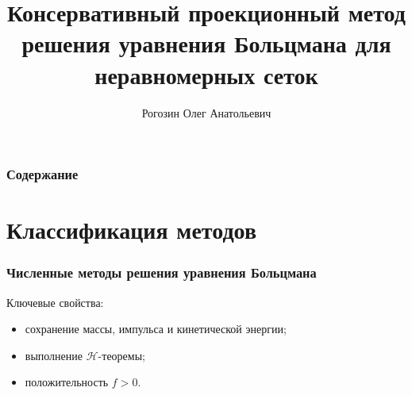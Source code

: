 \documentclass[mathserif]{beamer} %
\title{Консервативный проекционный метод решения уравнения Больцмана для неравномерных сеток}
\author{Рогозин Олег Анатольевич}
\institute{
    Вычислительный центр ФИЦ ИУ РАН
}
\date{}
\begin{document}
\frame{\titlepage}

\begin{frame}
    \frametitle{Содержание}
    \linespread{0.8}
    \tableofcontents
\end{frame}

\section{Классификация методов}

\begin{frame}
    \frametitle{Численные методы решения уравнения Больцмана}
    Ключевые свойства:
    \begin{itemize}
        \item сохранение массы, импульса и кинетической энергии;
        \item выполнение \(\mathcal{H}\)-теоремы;
        \item положительность \(f>0\).
    \end{itemize}
\end{frame}
\end{document}
